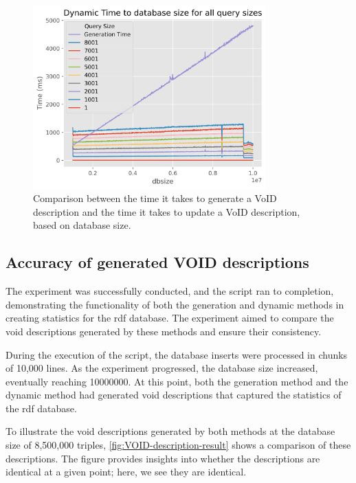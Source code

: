 \begin{figure}[t]
    \centering
    \includegraphics[width=0.8\textwidth]{figures/comparison-Generation-vs-Update.png}
    \caption{Comparison between the time it takes to generate a VoID description and the time it takes to update a VoID description, based on database size.}
    \label{fig:comparison-generation-vs-update}
\end{figure}

\subsection{Accuracy of generated VOID descriptions}
The experiment was successfully conducted, and the script ran to completion, demonstrating the functionality of both the generation and dynamic methods in creating statistics for the  \gls{rdf} database. The experiment aimed to compare the \gls{void} descriptions generated by these methods and ensure their consistency.


During the execution of the script, the database inserts were processed in chunks of 10,000 lines. As the experiment progressed, the database size increased, eventually reaching 10000000. At this point, both the generation method and the dynamic method had generated \gls{void} descriptions that captured the statistics of the  \gls{rdf} database.


To illustrate the \gls{void} descriptions generated by both methods at the database size of 8,500,000 triples, \autoref*{fig:VOID-description-result} shows a comparison of these descriptions. The figure provides insights into whether the descriptions are identical at a given point; here, we see they are identical.


